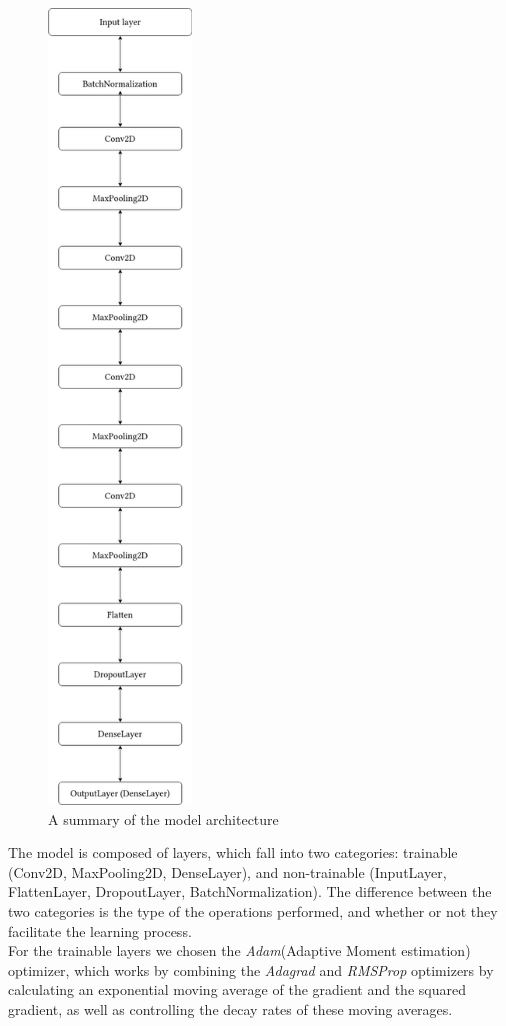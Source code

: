 \begin{figure}[H]
	\centering
	\includegraphics[width = 1.5in]{images/summary.png}
	\caption{A summary of the model architecture}
\label{model_arch}
\end{figure}

The model is composed of layers, which fall into two categories: trainable (Conv2D, MaxPooling2D, DenseLayer), and non-trainable
(InputLayer, FlattenLayer, DropoutLayer, BatchNormalization). The difference between the two categories is the type of the operations
performed, and whether or not they facilitate the learning process.\\

For the trainable layers we chosen the \textit{Adam}(Adaptive Moment estimation) optimizer, which works
by combining the \textit{Adagrad} and \textit{RMSProp} optimizers by calculating an exponential moving average
of the gradient and the squared gradient, as well as controlling the decay rates of these moving averages.\cite{nnfs}

